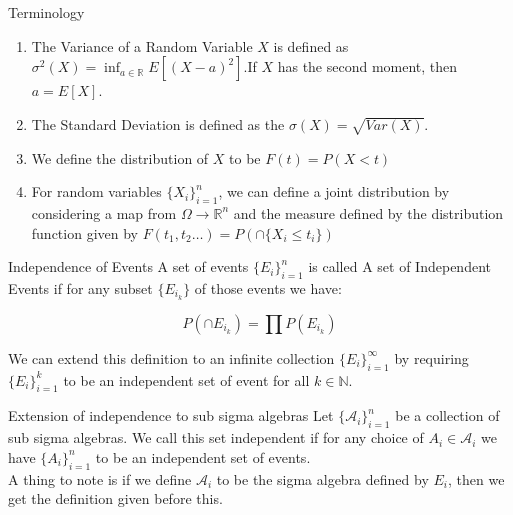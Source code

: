 \documentclass{beamer}
\begin{document}
\begin{frame}{Terminology}
    \begin{enumerate}
         \item The \textcolor{colorblue}{Variance} of a Random Variable \textcolor{colororange}{$X$} is defined as \textcolor{colororange}{$\sigma^2(X)=\inf_{a\in\mathbb R}E[(X-a)^2]$}.\pause If \textcolor{colororange}{$X$} has the second moment, then \textcolor{colororange}{$a=E[X]$}.\pause
         \item The \textcolor{colorblue}{Standard Deviation} is defined as the \textcolor{colororange}{$\sigma(X)=\sqrt{Var(X)}$}.\pause
         \item We define the \textcolor{colorblue}{distribution} of \textcolor{colororange}{$X$} to be \textcolor{colororange}{$F(t)=P(X<t)$}\pause
        \everymath{\color{colororange}}
         \item For random variables $\{X_i\}_{i=1}^n$, we can define a joint distribution by considering a map from $\Omega\to \mathbb R^n$ and the measure defined by the distribution function given by $F(t_1,t_2\hdots)=P(\cap \{X_i\leq t_i\})$
    \end{enumerate}
    
\end{frame}




\begin{frame}{Independence of Events}
A set of events $\{E_i\}_{i=1}^n$ is called \textcolor{colorblue}{ A set of Independent Events} if for any subset $\{E_{i_k}\}$ of those events we have:
\begin{tcolorbox}
    $$P(\cap E_{i_k})=\prod P(E_{i_k})$$
\end{tcolorbox}\pause
We can extend this definition to an infinite collection $\{E_i\}_{i=1}^\infty$ by requiring   $\{E_i\}_{i=1}^k$ to be an independent set of event for all $k\in\mathbb N$.
\end{frame}
\begin{frame}{Extension of independence to sub sigma algebras}
    Let $\{\mathcal A_i\}_{i=1}^n$ be a collection of sub sigma algebras. We call this set independent if for any choice of $A_i\in \mathcal A_i$ we have $\{A_i\}_{i=1}^n$ to be an independent set of events.\pause\\ A thing to note is if we define $\mathcal A_i$ to be the sigma algebra defined by $E_i$, then we get the definition given before this. 
\end{frame}
\end{document}
